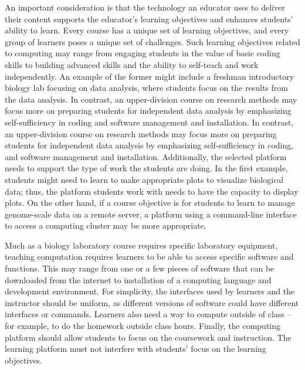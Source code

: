 An important consideration is that the technology an educator uses to deliver their content supports the educator's learning objectives and enhances students' ability to learn. 
Every course has a unique set of learning objectives, and
every group of learners poses a unique set of challenges. 
Such learning objectives related to computing may range from engaging students in the value of basic coding skills to building advanced skills and the ability to self-teach and work independently.
An example of the former might include a freshman introductory biology lab focusing on data analysis, where students focus on the results from the data analysis. 
In contrast, an upper-division course on research methods may focus more on preparing students for independent data analysis by emphasizing self-sufficiency in coding and software management and installation.
In contrast, an upper-division course on research methods may focus more on preparing students for independent data analysis by emphasizing self-sufficiency in coding, and software management and installation.
Additionally, the selected platform needs to support the type of work the students are doing.
In the first example, students might need to learn to make appropriate plots to visualize biological data; thus, the platform students work with needs to have the capacity to display plots.
On the other hand, if a course objective is for students to learn to manage genome-scale data on a remote server, a platform using a command-line interface to access a computing cluster may be more appropriate.

Much as a biology laboratory course requires specific laboratory equipment, teaching computation requires learners to be able to access specific software and functions.
This may range from one or a few pieces of software that can be downloaded from the internet
to installation of a computing language and development environment.
For simplicity,
the interfaces used by learners and the instructor should be uniform, as different versions of software could have different interfaces or commands.
Learners also need  a way to compute outside of class -- for example, to do the homework outside class hours.
Finally, the computing platform should allow students to focus on the coursework and instruction. 
The learning platform must not interfere with students' focus on the learning objectives.

